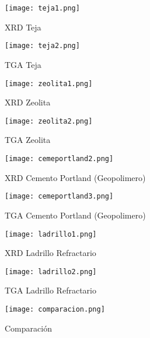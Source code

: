 \documentclass[a4paper, 11pt]{article}
\begin{document}
\begin{figure}[h!] 
\centering
    \texttt{[image: teja1.png]}
     \caption{XRD Teja}
    \label{teja_xrd}
\end{figure}

\begin{figure}[h!] 
\centering
    \texttt{[image: teja2.png]}
     \caption{TGA Teja}
    \label{teja_tga}
\end{figure}

\begin{figure}[h!] 
\centering
    \texttt{[image: zeolita1.png]}
     \caption{XRD Zeolita}
    \label{zeolita_xrd}
\end{figure}

\begin{figure}[h!] 
\centering
    \texttt{[image: zeolita2.png]}
     \caption{TGA Zeolita}
    \label{zeolita_tga}
\end{figure}

\begin{figure}[h!] 
\centering
    \texttt{[image: cemeportland2.png]}
     \caption{XRD Cemento Portland (Geopolimero)}
    \label{cemeportland_xrd}
\end{figure}

\begin{figure}[h!] 
\centering
    \texttt{[image: cemeportland3.png]}
     \caption{TGA Cemento Portland (Geopolimero)}
    \label{cemeportland_tga}
\end{figure}

\begin{figure}[h!] 
\centering
    \texttt{[image: ladrillo1.png]}
     \caption{XRD Ladrillo Refractario}
    \label{ladrillo_xrd}
\end{figure}


\begin{figure}[h!] 
\centering
    \texttt{[image: ladrillo2.png]}
     \caption{TGA Ladrillo Refractario}
    \label{ladrillo_tga}
\end{figure}


\begin{figure}[h!] 

    \texttt{[image: comparacion.png]}
     \caption{Comparación}
    \label{comparacion}
\end{figure}
\end{document}
